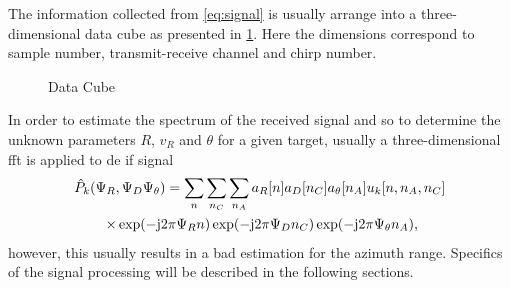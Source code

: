 The information collected from \cref{eq:signal} is usually arrange into a three-dimensional data cube as presented in \cref{fig:datacube}. Here the dimensions correspond to sample number, transmit-receive channel and chirp number. 

\begin{figure}[h]
	\centering
	
	\caption{Data Cube}
	\label{fig:datacube}
\end{figure} 

In order to estimate the spectrum of the received signal and so to determine the unknown parameters $R$, $v_R$ and $\theta$ for a given target, usually a three-dimensional \ac{fft} is applied to de \Ac{if} signal
\begin{multline}
\hat{P}_k(\Psi_R,\Psi_D\Psi_\theta) = \sum_{n}\sum_{n_C}\sum_{n_A} a_R[n] a_D[n_C] a_\theta[n_A]u_k[n,n_A,n_C]\\
\times\exp(-\mj2\pi\Psi_Rn)\exp(-\mj2\pi\Psi_Dn_C)\exp(-\mj2\pi\Psi_\theta n_A) \rlap{,}
\end{multline}
however, this usually results in a bad estimation for the azimuth range. Specifics of the signal processing will be described in the following sections. 